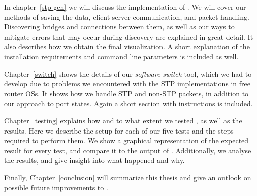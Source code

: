 In chapter~\ref{stp-gen} we will discuss the implementation of \tool.
We will cover our methods of saving the data, client-server communication, and packet handling.
Discovering bridges and connections between them, as well as our ways to mitigate errors that may occur during discovery are explained in great detail.
It also describes how we obtain the final visualization.
A short explanation of the installation requirements and command line parameters is included as well.


Chapter~\ref{switch} shows the details of our \textit{software-switch} tool, which we had to develop due to problems we encountered with the STP implementations in free router OSs\cite{OpenWrt}\cite{dd-wrt}.
It shows how we handle STP and non-STP packets, in addition to our approach to port states.
Again a short section with instructions is included.

Chapter~\ref{testing} explains how and to what extent we tested \tool, as well as the results.
Here we describe the setup for each of our five tests and the steps required to perform them.
We show a graphical representation of the expected result for every test, and compare it to the output of \tool.
Additionally, we analyse the results, and give insight into what happened and why.

Finally, Chapter~\ref{conclusion} will summarize this thesis and give an outlook on possible future improvements to \tool.
